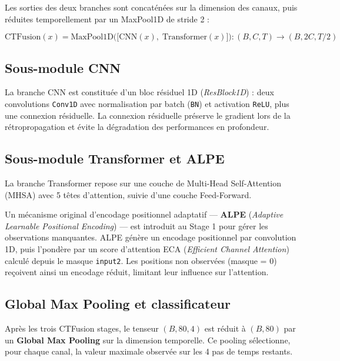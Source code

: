 Les sorties des deux branches sont concaténées sur la dimension des canaux,
puis réduites temporellement par un MaxPool1D de stride 2 :

\begin{equation}
  \text{CTFusion}(x) = \text{MaxPool1D}\Big(\big[\text{CNN}(x),\; \text{Transformer}(x)\big]\Big)
  : (B, C, T) \to (B, 2C, T/2)
  \label{eq:ctfusion}
\end{equation}

\subsection{Sous-module CNN}

La branche CNN est constituée d'un bloc résiduel 1D (\textit{ResBlock1D}) :
deux convolutions \texttt{Conv1D} avec normalisation par batch (\texttt{BN})
et activation \texttt{ReLU}, plus une connexion résiduelle. La connexion
résiduelle préserve le gradient lors de la rétropropagation et évite la
dégradation des performances en profondeur.

\subsection{Sous-module Transformer et ALPE}
\label{sec:alpe}

La branche Transformer repose sur une couche de Multi-Head Self-Attention
(MHSA) avec 5 têtes d'attention, suivie d'une couche Feed-Forward.

Un mécanisme original d'encodage positionnel adaptatif — \textbf{ALPE}
(\textit{Adaptive Learnable Positional Encoding}) — est introduit au Stage 1
pour gérer les observations manquantes. ALPE génère un encodage positionnel
par convolution 1D, puis l'pondère par un score d'attention ECA
(\textit{Efficient Channel Attention}) calculé depuis le masque \texttt{input2}.
Les positions non observées (masque = 0) reçoivent ainsi un encodage réduit,
limitant leur influence sur l'attention.

\subsection{Global Max Pooling et classificateur}

Après les trois CTFusion stages, le tenseur $(B, 80, 4)$ est réduit à
$(B, 80)$ par un \textbf{Global Max Pooling} sur la dimension temporelle.
Ce pooling sélectionne, pour chaque canal, la valeur maximale observée sur
les 4 pas de temps restants.

